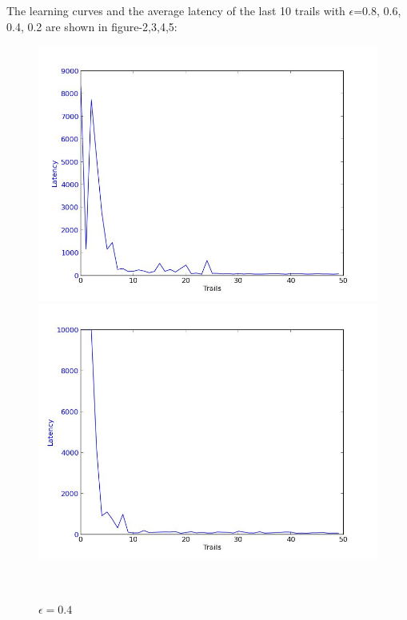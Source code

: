 \documentclass[a4paper, 12pt]{article}
\begin{document}
The learning curves and the average latency of the last 10 trails with $\epsilon$=0.8, 0.6, 0.4, 0.2 are shown in figure-2,3,4,5:

\begin{figure}
  \centering
  \begin{minipage}[c]{0.5\textwidth}
    \centering
    \includegraphics[scale=0.3]{../figure/eps2.jpeg}
      \caption{$\epsilon = 0.2$}
  \end{minipage}%
  \begin{minipage}[c]{0.5\textwidth}
    \centering
    \includegraphics[scale=0.3]{../figure/eps4.jpeg}
      \caption{$\epsilon = 0.4$}
    \end{minipage}
    \\

\end{figure}
\end{document}
